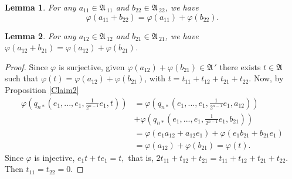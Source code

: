 \documentclass[10pt,a4paper]{amsart}
\newtheorem{lemma}{Lemma}
\def\A{{\mathfrak A}\, }
\begin{document}
\begin{lemma}\label{lema1} For any $a_{11} \in \A_{11}$ and $b_{22} \in \A_{22}$, we have 
$$\varphi(a_{11} + b_{22}) = \varphi(a_{11}) + \varphi(b_{22}).$$
\end{lemma}

\begin{lemma}\label{lema2}
For any $a_{12} \in \A_{12}$ and $b_{21} \in \A_{21}$, we have $\varphi(a_{12} + b_{21}) = \varphi(a_{12}) + \varphi(b_{21})$.
\end{lemma}

\begin{proof}
Since $\varphi$ is surjective, given $\varphi(a_{12})+\varphi(b_{21}) \in \A'$ there exists $t \in \A$ such that 
$\varphi(t) = \varphi(a_{12})+\varphi(b_{21})$, with $t=t_{11}+t_{12}+t_{21}+t_{22}$. Now, by Proposition \ref{Claim2}
$$
\begin{aligned}
\varphi\left(q_{n*}\left(e_1,...,e_1,\frac{1}{2^{n-1}}e_1,t\right)\right) &= \varphi\left(q_{n*}\left(e_1,...,e_1,\frac{1}{2^{n-1}}e_1,a_{12}\right)\right) \\
& +\varphi\left(q_{n*}\left(e_1,...,e_1,\frac{1}{2^{n-1}}e_1,b_{21}\right)\right) \\ 
&= \varphi(e_1a_{12} + a_{12}e_1) + \varphi(e_1b_{21} + b_{21}e_1) \\
&= \varphi(a_{12}) + \varphi(b_{21}) = \varphi(t).
\end{aligned}
$$
Since $\varphi$ is injective, $e_1t + te_1 = t,$ that is,
$2t_{11} + t_{12} + t_{21} = t_{11}+t_{12}+t_{21}+t_{22}.
$ Then $t_{11} = t_{22} = 0$.







\end{proof}
\end{document}
